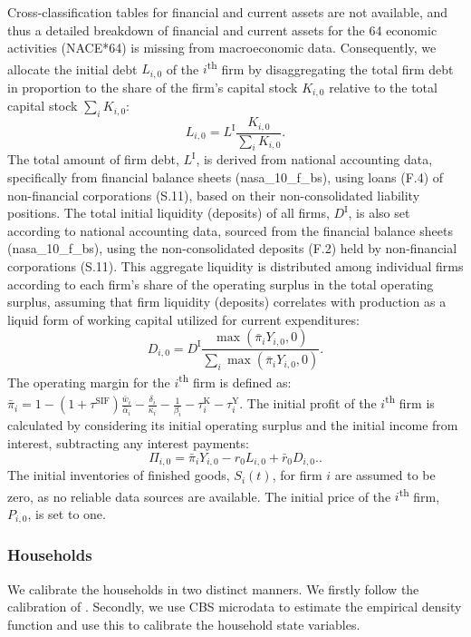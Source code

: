 Cross-classification tables for financial and current assets are not available, and thus a detailed breakdown of financial and current assets for the 64 economic activities (NACE*64) is missing from macroeconomic data. Consequently, we allocate the initial debt $L_{i,0}$ of the $i$\textsuperscript{th} firm by disaggregating the total firm debt in proportion to the share of the firm’s capital stock $K_{i,0}$ relative to the total capital stock $\sum_iK_{i,0}$:
\begin{equation*} 
	L_{i,0}=L^{\mathrm{I}}\frac{K_{i,0}}{\sum_iK_{i,0}}.
\end{equation*}
The total amount of firm debt, $L^{\mathrm{I}}$, is derived from national accounting data, specifically from financial balance sheets (nasa\_10\_f\_bs), using loans (F.4) of non-financial corporations (S.11), based on their non-consolidated liability positions. The total initial liquidity (deposits) of all firms, $D^{\mathrm{I}}$, is also set according to national accounting data, sourced from the financial balance sheets (nasa\_10\_f\_bs), using the non-consolidated deposits (F.2) held by non-financial corporations (S.11). This aggregate liquidity is distributed among individual firms according to each firm’s share of the operating surplus in the total operating surplus, assuming that firm liquidity (deposits) correlates with production as a liquid form of working capital utilized for current expenditures:
\begin{equation*} 
	D_{i,0}=D^{\mathrm{I}}\frac{\max(\bar{\pi}_{i}Y_{i,0},0)}{\sum_{i}\max(\bar{\pi}_{i}Y_{i,0},0)}.
\end{equation*}
The operating margin for the $i$\textsuperscript{th} firm is defined as: $\bar{\pi}_{i}=1-\left(1+\tau^{\mathrm{SIF}}\right) \frac{\bar{w}_{i}}{\bar{\alpha}_{i}}-\frac{\delta_{i}}{\kappa_{i}}-\frac{1}{\beta_{i}}-\tau^{\mathrm{K}}_{i}-\tau^{\mathrm{Y}}_{i}$. The initial profit of the $i$\textsuperscript{th} firm is calculated by considering its initial operating surplus and the initial income from interest, subtracting any interest payments: 
\begin{equation*} 
	\Pi_{i,0}=\bar{\pi}_{i}Y_{i,0}-r_{0} L_{i,0}+\bar{r}_{0} D_{i,0}.
.\end{equation*}
The initial inventories of finished goods, $S_{i}(t)$, for firm $i$ are assumed to be zero, as no reliable data sources are available. The initial price of the $i$\textsuperscript{th} firm, $P_{i,0}$, is set to one.

\subsubsection{Households} \label{sec:hh_initial_conditions}
We calibrate the households in two distinct manners. We firstly follow the calibration of \cite{poledna_economic_2019}. Secondly, we use CBS microdata to estimate the empirical density function and use this to calibrate the household state variables.\\

